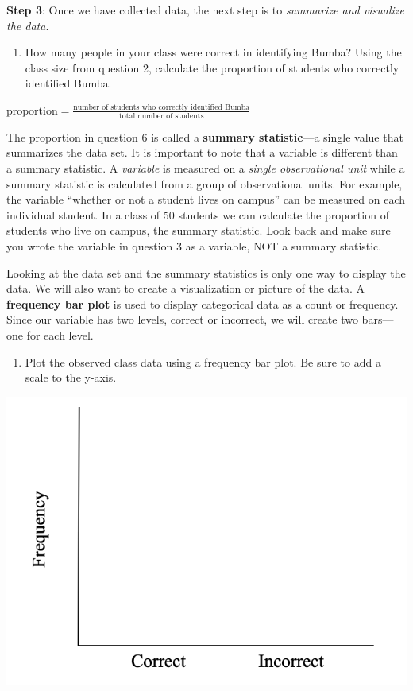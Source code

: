 \documentclass[
]{report}
\providecommand{\tightlist}{%
  \setlength{\itemsep}{0pt}\setlength{\parskip}{0pt}}
\begin{document}
\newpage

\textbf{Step 3}: Once we have collected data, the next step is to \emph{summarize and visualize the data}.

\begin{enumerate}
\def\labelenumi{\arabic{enumi}.}
\setcounter{enumi}{5}
\tightlist
\item
  How many people in your class were correct in identifying Bumba? Using the class size from question 2, calculate the proportion of students who correctly identified Bumba.
\end{enumerate}

\begin{center}
$\mbox{proportion} = \frac{\mbox{number of students who correctly identified Bumba}}{\mbox{total number of students}}$
\end{center}

\vspace{0.7in}

The proportion in question 6 is called a \textbf{summary statistic}---a single value that summarizes the data set. It is important to note that a variable is different than a summary statistic. A \emph{variable} is measured on a \emph{single observational unit} while a summary statistic is calculated from a group of observational units. For example, the variable ``whether or not a student lives on campus'' can be measured on each individual student. In a class of 50 students we can calculate the proportion of students who live on campus, the summary statistic. Look back and make sure you wrote the variable in question 3 as a variable, NOT a summary statistic.

Looking at the data set and the summary statistics is only one way to display the data. We will also want to create a visualization or picture of the data. A \textbf{frequency bar plot} is used to display categorical data as a count or frequency. Since our variable has two levels, correct or incorrect, we will create two bars---one for each level.

\begin{enumerate}
\def\labelenumi{\arabic{enumi}.}
\setcounter{enumi}{6}
\tightlist
\item
  Plot the observed class data using a frequency bar plot. Be sure to add a scale to the y-axis.
\end{enumerate}

\begin{center}\includegraphics[width=0.4\linewidth]{images/barplot_martian} \end{center}
\end{document}
